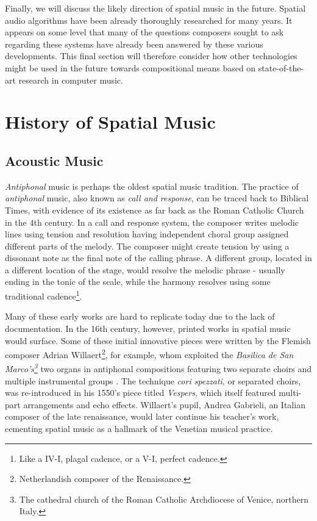 Finally, we will discuss the likely direction of spatial music in the future. Spatial audio algorithms have been already thoroughly researched for many years. It appears on some level that many of the questions composers sought to ask regarding these systems have already been answered by these various developments. This final section will therefore consider how other technologies might be used in the future towards compositional means based on state-of-the-art research in computer music. 

\section{History of Spatial Music} \label{sec:hist_spat_mus}

\subsection{Acoustic Music} \label{subsec:acoustic_mus}


\textit{Antiphonal} music is perhaps the oldest spatial music tradition. The practice of \textit{antiphonal} music, also known as \textit{call and response}, can be traced back to Biblical Times, with evidence of its existence as far back as the Roman Catholic Church in the 4th century. In a call and response system, the composer writes melodic lines using tension and resolution having independent choral group assigned different parts of the melody. The composer might create tension by using a dissonant note as the final note of the calling phrase. A different group, located in a different location of the stage, would resolve the melodic phrase - usually ending in the tonic of the scale, while the harmony resolves using some traditional cadence\footnote{Like a IV-I, plagal cadence, or a V-I, perfect cadence.}. 

Many of these early works are hard to replicate today due to the lack of documentation. In the 16th century, however, printed works in spatial music would surface. Some of these initial innovative pieces were written by the Flemish composer Adrian Willaert\footnote{Netherlandish composer of the Renaissance.}, for example, whom exploited the \textit{Basilica de San Marco's\footnote{The cathedral church of the Roman Catholic Archdiocese of Venice, northern Italy.}} two organs in antiphonal compositions featuring two separate choirs and multiple instrumental groups \cite{arnold1959significance}. The technique \textit{cori spezzati}, or separated choirs, was re-introduced in his 1550's piece titled \textit{Vespers}, which itself featured multi-part arrangements and echo effects. Willaert's pupil, Andrea Gabrieli, an Italian composer of the late renaissance, would later continue his teacher's work, cementing spatial music as a hallmark of the Venetian musical practice. 

